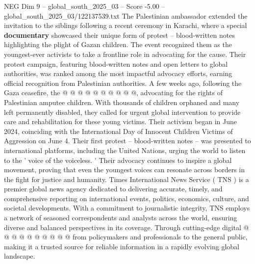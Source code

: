 \begin{textsample}{NEG Dim 9 – global\_south\_2025\_03 – Score -5.00 – global\_south\_2025\_03/122137539.txt}
The Palestinian ambassador extended the invitation to the siblings following a recent ceremony in Karachi, where a special \textbf{documentary} showcased their unique form of protest -- blood-written notes highlighting the plight of Gazan children.
The event recognized them as the youngest-ever activists to take a frontline role in advocating for the cause.
Their protest campaign, featuring blood-written notes and open letters to global authorities, was ranked among the most impactful advocacy efforts, earning official recognition from Palestinian authorities.
A few weeks ago, following the Gaza ceasefire, the @ @ @ @ @ @ @ @ @ @, advocating for the rights of Palestinian amputee children.
With thousands of children orphaned and many left permanently disabled, they called for urgent global intervention to provide care and rehabilitation for these young victims.
Their activism began in June 2024, coinciding with the International Day of Innocent Children Victims of Aggression on June 4.
Their first protest -- blood-written notes -- was presented to international platforms, including the United Nations, urging the world to listen to the ' voice of the voiceless. ' Their advocacy continues to inspire a global movement, proving that even the youngest voices can resonate across borders in the fight for justice and humanity.
Times International News Service ( TNS ) is a premier global news agency dedicated to delivering accurate, timely, and comprehensive reporting on international events, politics, economics, culture, and societal developments.
With a commitment to journalistic integrity, TNS employs a network of seasoned correspondents and analysts across the world, ensuring diverse and balanced perspectives in its coverage.
Through cutting-edge digital @ @ @ @ @ @ @ @ @ @ from policymakers and professionals to the general public, making it a trusted source for reliable information in a rapidly evolving global landscape.

\end{textsample}
